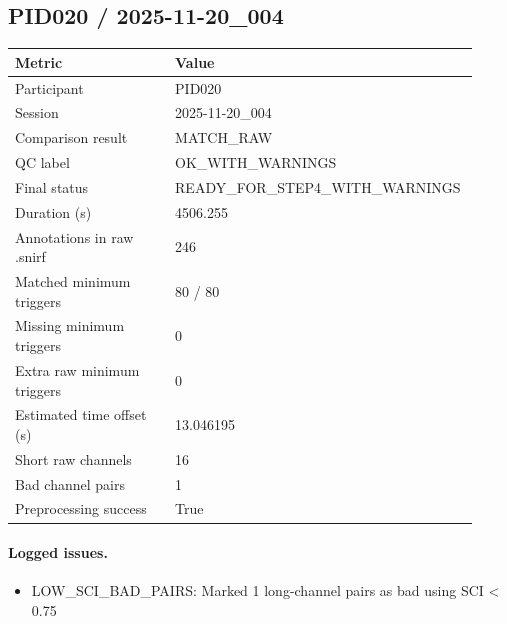 \subsection*{PID020 / 2025-11-20\_004}
\begin{tabular}{p{0.34\linewidth}p{0.58\linewidth}}
\toprule
Metric & Value\\
\midrule
Participant & PID020\\
Session & 2025-11-20\_004\\
Comparison result & MATCH\_RAW\\
QC label & OK\_WITH\_WARNINGS\\
Final status & READY\_FOR\_STEP4\_WITH\_WARNINGS\\
Duration (s) & 4506.255\\
Annotations in raw .snirf & 246\\
Matched minimum triggers & 80 / 80\\
Missing minimum triggers & 0\\
Extra raw minimum triggers & 0\\
Estimated time offset (s) & 13.046195\\
Short raw channels & 16\\
Bad channel pairs & 1\\
Preprocessing success & True\\
\bottomrule
\end{tabular}
\paragraph{Logged issues.}
\begin{itemize}
\item [WARNING] LOW\_SCI\_BAD\_PAIRS: Marked 1 long-channel pairs as bad using SCI < 0.75
\end{itemize}
